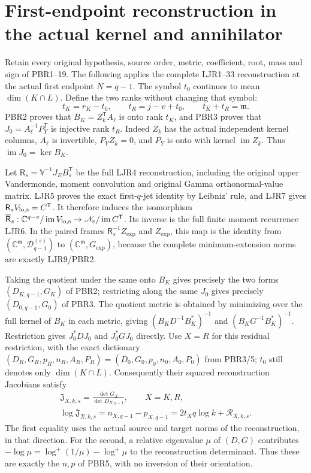 \documentclass[11pt,a4paper]{article}
\begin{document}
\clearpage
\section{First-endpoint reconstruction in the actual kernel and annihilator}
\label{sec:LRR}

Retain every original hypothesis, source order, metric, coefficient,
root, mass and sign of PBR1--19. The following applies the complete
LJR1--33 reconstruction at the actual first endpoint $N=q-1$.
The symbol $t_0$ continues to mean $\dim(K\cap L)$.
Define the two ranks without changing that symbol:
\[
 t_K=r_K-t_0,\qquad
 t_R=j-v+t_0,\qquad
 t_K+t_R=\mathfrak m.
 \tag{LRR1}
\]
PBR2 proves that $B_K=Z_k^{\mathsf T}A_\ell$ is onto rank
$t_K$, and PBR3 proves that
$J_0=A_\ell^{-1}P_Y^{\mathsf T}$ is injective rank $t_R$.
Indeed $Z_k$ has the actual independent kernel columns,
$A_\ell$ is invertible, $P_YZ_k=0$, and $P_Y$ is onto with
kernel $\operatorname{im}Z_k$. Thus
$\operatorname{im}J_0=\ker B_K$.

Let $\mathsf R_s=\mathbb V^{-1}J_EB_s^{\mathsf T}$ be the full
LJR4 reconstruction, including the original upper Vandermonde,
moment convolution and original Gamma orthonormal-value matrix.
LJR5 proves the exact first-$q$-jet identity by Leibniz' rule,
and LJR7 gives $\mathsf R_sV_{\rm lo,s}=C^{\mathsf T}$.
It therefore induces the isomorphism
$\overline{\mathsf R}_s:
\mathbb C^{q-v}/\operatorname{im}V_{\rm lo,s}
\to\mathscr N_v/\operatorname{im}C^{\mathsf T}$.
Its inverse is the full finite moment recurrence LJR6.
In the paired frames $\mathsf R_s^{-1}Z_{\exp}$ and $Z_{\exp}$,
this map is the identity from
$(\mathbb C^{\mathfrak m},\mathcal D_{q-1}^{(s)})$ to
$(\mathbb C^{\mathfrak m},G_{\exp})$, because the complete
minimum-extension norms are exactly LJR9/PBR2.

Taking the quotient under the same onto $B_K$ gives precisely
the two forms $(D_{K,q-1},G_K)$ of PBR2; restricting along the
same $J_0$ gives precisely $(D_{0,q-1},G_0)$ of PBR3.
The quotient metric is obtained by minimizing over the full
kernel of $B_K$ in each metric, giving
$(B_KD^{-1}B_K^*)^{-1}$ and $(B_KG^{-1}B_K^*)^{-1}$.
Restriction gives $J_0^*DJ_0$ and $J_0^*GJ_0$ directly.
Use $X=R$ for this residual restriction, with the exact dictionary
$(D_R,G_R,p_R,n_R,A_R,P_R)=(D_0,G_0,p_0,n_0,A_0,P_0)$
from PBR3/5; $t_0$ still denotes only $\dim(K\cap L)$.
Consequently their squared reconstruction Jacobians satisfy
\[
\begin{gathered}
 \mathfrak J_{X,k,s}
   =\frac{\det G_X}{\det D_{X,q-1}},\qquad X=K,R,\\
 \log\mathfrak J_{X,k,s}
   =n_{X,q-1}-p_{X,q-1}
   =2t_Xq\log k+\mathscr R_{X,k,s}.
\end{gathered}\tag{LRR2}
\]
The first equality uses the actual source and target norms of
the reconstruction, in that direction. For the second, a relative
eigenvalue $\mu$ of $(D,G)$ contributes $-\log\mu
=\log^+(1/\mu)-\log^+\mu$ to the reconstruction determinant.
Thus these are exactly the $n,p$ of PBR5, with no inversion
of their orientation.
\end{document}
